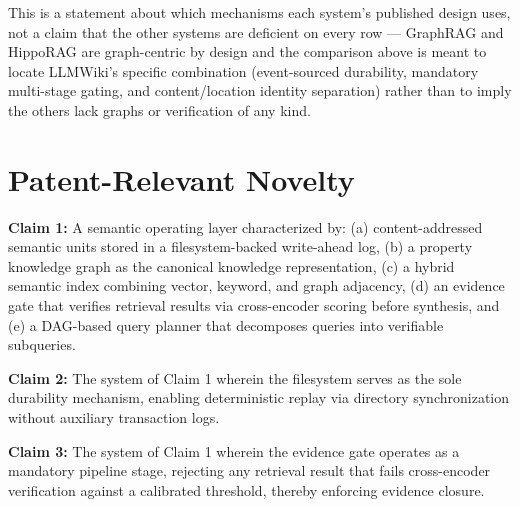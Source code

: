 This is a statement about which mechanisms each system's published design uses, not a claim that the other systems are deficient on every row --- GraphRAG and HippoRAG are graph-centric by design and the comparison above is meant to locate LLMWiki's specific combination (event-sourced durability, mandatory multi-stage gating, and content/location identity separation) rather than to imply the others lack graphs or verification of any kind.

\section{Patent-Relevant Novelty}
\label{sec:architecture:patent}

\begin{patentclaim}
\textbf{Claim 1:} A semantic operating layer characterized by: (a) content-addressed semantic units stored in a filesystem-backed write-ahead log, (b) a property knowledge graph as the canonical knowledge representation, (c) a hybrid semantic index combining vector, keyword, and graph adjacency, (d) an evidence gate that verifies retrieval results via cross-encoder scoring before synthesis, and (e) a DAG-based query planner that decomposes queries into verifiable subqueries.
\end{patentclaim}

\begin{patentclaim}
\textbf{Claim 2:} The system of Claim 1 wherein the filesystem serves as the sole durability mechanism, enabling deterministic replay via directory synchronization without auxiliary transaction logs.
\end{patentclaim}

\begin{patentclaim}
\textbf{Claim 3:} The system of Claim 1 wherein the evidence gate operates as a mandatory pipeline stage, rejecting any retrieval result that fails cross-encoder verification against a calibrated threshold, thereby enforcing evidence closure.
\end{patentclaim}

